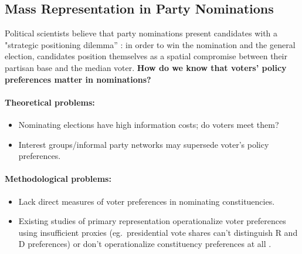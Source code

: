 \documentclass[a0]{a0poster}
\begin{document}
\vspace{2em} %
%
%
%
%
%
%
%
%
\begin{multicols*}{3}

\Large
\raggedright

\raggedcolumns

\section*{Mass Representation in Party Nominations}

Political scientists believe that party nominations present candidates with a "strategic positioning dilemma'' \parencite{brady-han-pope:2007:out-of-step}: in order to win the nomination and the general election, candidates position themselves as a spatial compromise between their partisan base and the median voter. \textsf{\textbf{How do we know that voters' policy preferences matter in nominations?}}

\paragraph{Theoretical problems:}
\begin{itemize}
  \item Nominating elections have high information costs; do voters meet them?
  \item Interest groups/informal party networks may supersede voter's policy preferences.
\end{itemize}

\paragraph{Methodological problems:}
\begin{itemize}
  \item Lack direct measures of voter preferences in nominating constituencies.
  \item Existing studies of primary representation operationalize voter preferences using insufficient proxies (eg.\ presidential vote shares can't distinguish R and D preferences) or don't operationalize constituency preferences at all \parencite{kernell2009giving}.
\end{itemize}


\end{multicols*}
\end{document}
